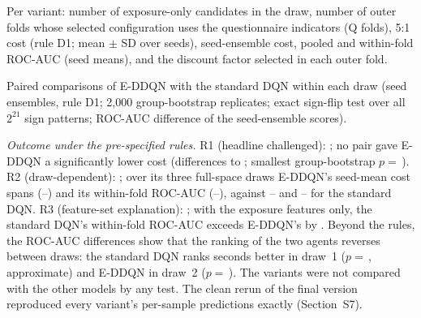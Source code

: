 Per variant: number of exposure-only candidates in the draw, number of outer folds whose selected configuration uses the questionnaire indicators (Q folds), 5:1 cost (rule D1; mean $\pm$ SD over seeds), seed-ensemble cost, pooled and within-fold ROC-AUC (seed means), and the discount factor selected in each outer fold.

\begin{center}\footnotesize
\resizebox{\textwidth}{!}{}
\end{center}

Paired comparisons of E-DDQN with the standard DQN within each draw (seed ensembles, rule D1; 2,000 group-bootstrap replicates; exact sign-flip test over all $2^{21}$ sign patterns; ROC-AUC difference of the seed-ensemble scores).

\begin{center}\footnotesize
\resizebox{\textwidth}{!}{}
\end{center}

\emph{Outcome under the pre-specified rules.} R1 (headline challenged): \SDROne{}; no pair gave E-DDQN a significantly lower cost (differences \SDCostDiffMin{} to \SDCostDiffMax; smallest group-bootstrap $p=$\,\SDCostPMin). R2 (draw-dependent): \SDRTwo{}; over its three full-space draws E-DDQN's seed-mean cost spans \SDCostSpan{} (\SDEDDQNCostMin--\SDEDDQNCostMax) and its within-fold ROC-AUC \SDWfSpan{} (\SDEDDQNWfMin--\SDEDDQNWfMax), against \SDDQNCostMin--\SDDQNCostMax{} and \SDDQNWfMin--\SDDQNWfMax{} for the standard DQN. R3 (feature-set explanation): \SDRThree; with the exposure features only, the standard DQN's within-fold ROC-AUC exceeds E-DDQN's by \SDExposureGap. Beyond the rules, the ROC-AUC differences show that the ranking of the two agents reverses between draws: the standard DQN ranks seconds better in draw~1 ($p=$\,\SDPairOneAucP, approximate) and E-DDQN in draw~2 ($p=$\,\SDPairTwoAucP). The variants were not compared with the other models by any test. The clean rerun of the final version reproduced every variant's per-sample predictions exactly (Section~S7).

